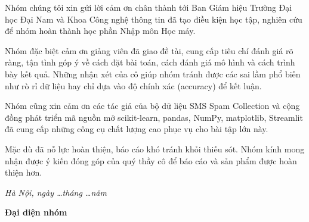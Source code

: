 
Nhóm chúng tôi xin gửi lời cảm ơn chân thành tới Ban Giám hiệu Trường Đại học Đại Nam và Khoa Công nghệ thông tin đã tạo điều kiện học tập, nghiên cứu để nhóm hoàn thành học phần Nhập môn Học máy.

Nhóm đặc biệt cảm ơn giảng viên \GiangVienHD{} đã giao đề tài, cung cấp tiêu chí đánh giá rõ ràng, tận tình góp ý về cách đặt bài toán, cách đánh giá mô hình và cách trình bày kết quả. Những nhận xét của cô giúp nhóm tránh được các sai lầm phổ biến như rò rỉ dữ liệu hay chỉ dựa vào độ chính xác (accuracy) để kết luận.

Nhóm cũng xin cảm ơn các tác giả của bộ dữ liệu SMS Spam Collection và cộng đồng phát triển mã nguồn mở scikit-learn, pandas, NumPy, matplotlib, Streamlit đã cung cấp những công cụ chất lượng cao phục vụ cho bài tập lớn này.

Mặc dù đã nỗ lực hoàn thiện, báo cáo khó tránh khỏi thiếu sót. Nhóm kính mong nhận được ý kiến đóng góp của quý thầy cô để báo cáo và sản phẩm được hoàn thiện hơn.

\vspace{1cm}

\begin{flushright}
\begin{minipage}{8cm}
\centering
\textit{Hà Nội, ngày \ldots tháng \ldots năm \Nam}

\vspace{0.5cm}

\textbf{Đại diện nhóm}

\vspace{2cm}
\end{minipage}
\end{flushright}
